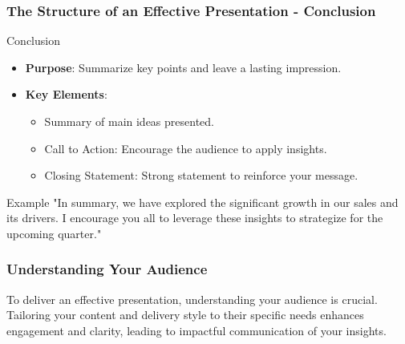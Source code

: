 \documentclass[aspectratio=169]{beamer}
\begin{document}
\begin{frame}[fragile]
    \frametitle{The Structure of an Effective Presentation - Conclusion}
    \begin{block}{Conclusion}
        \begin{itemize}
            \item \textbf{Purpose}: Summarize key points and leave a lasting impression.
            \item \textbf{Key Elements}:
                \begin{itemize}
                    \item Summary of main ideas presented.
                    \item Call to Action: Encourage the audience to apply insights.
                    \item Closing Statement: Strong statement to reinforce your message.
                \end{itemize}
        \end{itemize}
    \end{block}
    \begin{block}{Example}
        "In summary, we have explored the significant growth in our sales and its drivers. I encourage you all to leverage these insights to strategize for the upcoming quarter."
    \end{block}
\end{frame}

\begin{frame}[fragile]
    \frametitle{Understanding Your Audience}
    To deliver an effective presentation, understanding your audience is crucial. Tailoring your content and delivery style to their specific needs enhances engagement and clarity, leading to impactful communication of your insights.
\end{frame}
\end{document}
